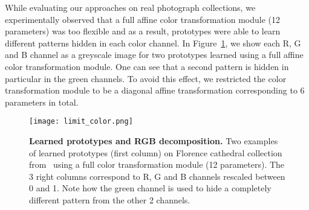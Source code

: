 \documentclass{article}
\begin{document}
While evaluating our approaches on real photograph collections, we experimentally observed 
that a full affine color transformation module (12 parameters) was too flexible and as a 
result, prototypes were able to learn different patterns hidden in each color channel. In 
Figure~\ref{fig:color_tsf}, we show each R, G and B channel as a greyscale image for two 
prototypes learned using a full affine color transformation module. One can see that a second 
pattern is hidden in particular in the green channels. To avoid this effect, we restricted 
the color transformation module to be a diagonal affine transformation corresponding to 6 
parameters in total.\begin{figure}[!h]
  \centering
  \texttt{[image: limit\_color.png]}
  \caption{\textbf{Learned prototypes and RGB decomposition.} Two examples of learned 
    prototypes (first column) on Florence cathedral collection from~\cite{li2018megadepth} 
  using a full color transformation module (12 parameters). The 3 right columns correspond to 
R, G and B channels rescaled between 0 and 1. Note how the green channel is used to hide a 
completely different pattern from the other 2 channels.}
  \label{fig:color_tsf}
  \vspace{-2em}
\end{figure}
\end{document}

